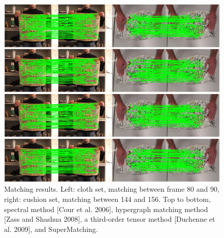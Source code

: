 \begin{figure}[tb]
\centering
  \includegraphics[width=1.00\linewidth]{figures/2DDeformable.jpg}
  \caption{Matching results. Left: cloth set, matching between frame 80 and 90, right: cushion set, matching between 144 and 156.
  Top to bottom, spectral method [Cour et al. 2006], hypergraph matching method [Zass and Shashua 2008], a third-order tensor method [Duchenne et al. 2009], and SuperMatching.}
\label{fig:2DDeformable}
\end{figure}

